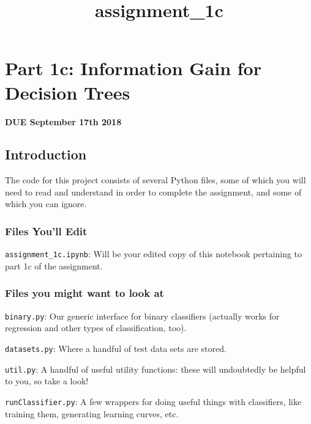 \documentclass[11pt]{article}
\title{assignment\_1c}
\begin{document}
    
    
    \maketitle
    
    

    
    \hypertarget{part-1c-information-gain-for-decision-trees}{%
\section{Part 1c: Information Gain for Decision
Trees}\label{part-1c-information-gain-for-decision-trees}}

\textbf{DUE September 17th 2018}

\hypertarget{introduction}{%
\subsection{Introduction}\label{introduction}}

The code for this project consists of several Python files, some of
which you will need to read and understand in order to complete the
assignment, and some of which you can ignore.

\hypertarget{files-youll-edit}{%
\subsubsection{Files You'll Edit}\label{files-youll-edit}}

\texttt{assignment\_1c.ipynb}: Will be your edited copy of this notebook
pertaining to part 1c of the assignment.

\hypertarget{files-you-might-want-to-look-at}{%
\subsubsection{Files you might want to look
at}\label{files-you-might-want-to-look-at}}

\texttt{binary.py}: Our generic interface for binary classifiers
(actually works for regression and other types of classification, too).

\texttt{datasets.py}: Where a handful of test data sets are stored.

\texttt{util.py}: A handful of useful utility functions: these will
undoubtedly be helpful to you, so take a look!

\texttt{runClassifier.py}: A few wrappers for doing useful things with
classifiers, like training them, generating learning curves, etc.
\end{document}
